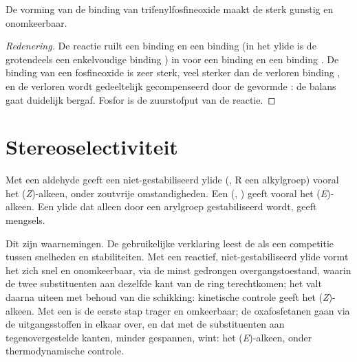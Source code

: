 \begin{proposition}\label{prop:b2:wittig:driving}
De vorming van de binding  van trifenylfosfineoxide maakt de  sterk
gunstig en onomkeerbaar.
\end{proposition}

\begin{proof}[Redenering]
De reactie ruilt een binding  en een binding  (in het ylide is de  grotendeels een
enkelvoudige binding ) in voor een binding  en een binding . De binding  van een fosfineoxide is
zeer sterk, veel sterker dan de verloren binding , en de verloren  wordt gedeeltelijk gecompenseerd
door de gevormde : de balans gaat duidelijk bergaf. Fosfor is de zuurstofput van de
reactie.
\end{proof}

\section{Stereoselectiviteit}

\begin{proposition}\label{prop:b2:wittig:stereo}
Met een aldehyde geeft een niet-gestabiliseerd ylide (, R een alkylgroep) vooral het (\textit{Z})-alkeen,
onder zoutvrije omstandigheden. Een  (, ) geeft vooral het
(\textit{E})-alkeen. Een ylide dat alleen door een arylgroep gestabiliseerd wordt, geeft mengsels.
\end{proposition}

\admitted

Dit zijn waarnemingen. De gebruikelijke verklaring leest de  als een competitie tussen
snelheden en stabiliteiten. Met een reactief, niet-gestabiliseerd ylide vormt het  zich snel en
onomkeerbaar, via de minst gedrongen overgangstoestand, waarin de twee substituenten aan dezelfde
kant van de ring terechtkomen; het valt daarna uiteen met behoud van die schikking: kinetische controle geeft het
(\textit{Z})-alkeen. Met een  is de eerste stap trager en omkeerbaar; de
oxafosfetanen gaan via de uitgangsstoffen in elkaar over, en dat met de substituenten aan
tegenovergestelde kanten, minder gespannen, wint: het (\textit{E})-alkeen, onder thermodynamische controle.

